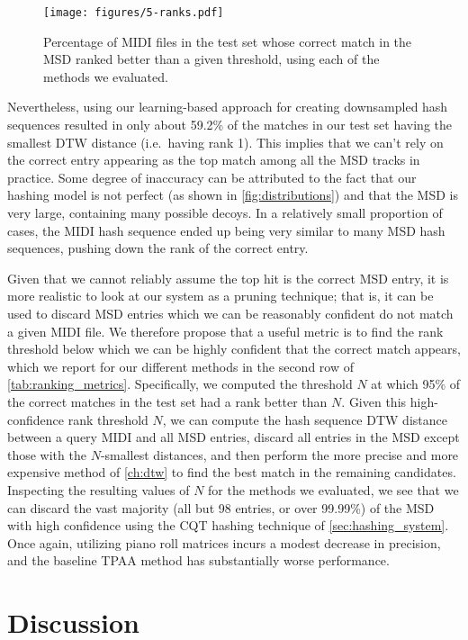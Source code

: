 \begin{figure}
  \texttt{[image: figures/5-ranks.pdf]}
  \caption[Percentage of the test set below a given rank]{Percentage of MIDI files in the test set whose correct match in the MSD ranked better than a given threshold, using each of the methods we evaluated.}
  \label{fig:ranks}
\end{figure}

Nevertheless, using our learning-based approach for creating downsampled hash sequences resulted in only about 59.2\% of the matches in our test set having the smallest DTW distance (i.e.\ having rank 1).
This implies that we can't rely on the correct entry appearing as the top match among all the MSD tracks in practice.
Some degree of inaccuracy can be attributed to the fact that our hashing model is not perfect (as shown in \cref{fig:distributions}) and that the MSD is very large, containing many possible decoys.
In a relatively small proportion of cases, the MIDI hash sequence ended up being very similar to many MSD hash sequences, pushing down the rank of the correct entry.

Given that we cannot reliably assume the top hit is the correct MSD entry, it is more realistic to look at our system as a pruning technique; that is, it can be used to discard MSD entries which we can be reasonably confident do not match a given MIDI file.
We therefore propose that a useful metric is to find the rank threshold below which we can be highly confident that the correct match appears, which we report for our different methods in the second row of \cref{tab:ranking_metrics}.
Specifically, we computed the threshold $N$ at which 95\% of the correct matches in the test set had a rank better than $N$.
Given this high-confidence rank threshold $N$, we can compute the hash sequence DTW distance between a query MIDI and all MSD entries, discard all entries in the MSD except those with the $N$-smallest distances, and then perform the more precise and more expensive method of \cref{ch:dtw} to find the best match in the remaining candidates.
Inspecting the resulting values of $N$ for the methods we evaluated, we see that we can discard the vast majority (all but 98 entries, or over 99.99\%) of the MSD with high confidence using the CQT hashing technique of \cref{sec:hashing_system}.
Once again, utilizing piano roll matrices incurs a modest decrease in precision, and the baseline TPAA method has substantially worse performance.

\section{Discussion}
\label{sec:dhs_discussion}


